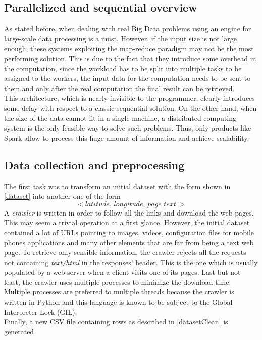 \documentclass{sig-alternate-05-2015}
\begin{document}
\subsection{Parallelized and sequential overview}
As stated before, when dealing with real Big Data problems using an engine for large-scale data processing is a must. However, if the input size is not large enough, these systems exploiting the map-reduce paradigm may not be the most performing solution. This is due to the fact that they introduce some overhead in the computation, since the workload has to be split into multiple tasks to be assigned to the workers, the input data for the computation needs to be sent to them and only after the real computation the final result can be retrieved.\\
This architecture, which is nearly invisible to the programmer, clearly introduces some delay with respect to a classic sequential solution. On the other hand, when the size of the data cannot fit in a single machine, a distributed computing system is the only feasible way to solve such problems. Thus, only products like Spark allow to process this huge amount of information and achieve scalability.
\subsection{Data collection and preprocessing}\label{preprocessing}
The first task was to transform an initial dataset with the form shown in \ref{dataset} into another one of the form
\begin{equation}\label{datasetClean}
    <latitude,\,longitude,\,page\_text\,>
\end{equation}
A \emph{crawler} is written in order to follow all the links and download the web pages. This may seem a trivial operation at a first glance. However, the initial dataset contained a lot of URLs pointing to images, videos, configuration files for mobile phones applications and many other elements that are far from being a text web page. To retrieve only sensible information, the crawler rejects all the requests not containing \emph{text/html} in the responses' header. This is the one which is usually populated by a web server when a client visits one of its pages. Last but not least, the crawler uses multiple processes to minimize the download time. Multiple processes are preferred to multiple threads because the crawler is written in Python and this language is known to be subject to the Global Interpreter Lock\cite{gil} (GIL).\\
Finally, a new CSV file containing rows as described in \ref{datasetClean} is generated.
\end{document}
